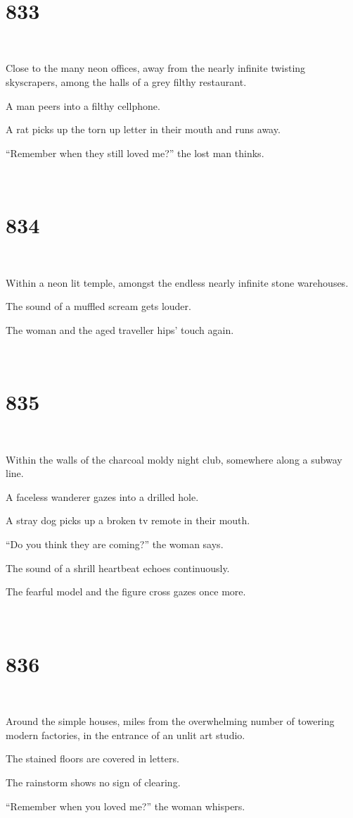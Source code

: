 \documentclass{report}
\begin{document}
~
\chapter*{833}
~

Close to the many neon offices, away from the nearly infinite twisting skyscrapers, among the halls of a grey filthy restaurant.

A man peers into a filthy cellphone.

A rat picks up the torn up letter in their mouth and runs away.

``Remember when they still loved me?'' the lost man thinks.

~
\chapter*{834}
~

Within a neon lit temple, amongst the endless nearly infinite stone warehouses.

The sound of a muffled scream gets louder.

The woman and the aged traveller hips' touch again.

~
\chapter*{835}
~

Within the walls of the charcoal moldy night club, somewhere along a subway line.

A faceless wanderer gazes into a drilled hole.

A stray dog picks up a broken tv remote in their mouth.

``Do you think they are coming?'' the woman says.

The sound of a shrill heartbeat echoes continuously.

The fearful model and the figure cross gazes once more.

~
\chapter*{836}
~

Around the simple houses, miles from the overwhelming number of towering modern factories, in the entrance of an unlit art studio.

The stained floors are covered in letters.

The rainstorm shows no sign of clearing.

``Remember when you loved me?'' the woman whispers.
\end{document}
